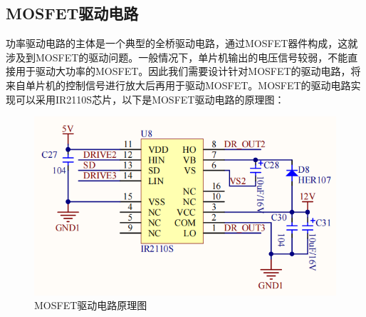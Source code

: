 \documentclass[UTF8]{article}
\begin{document}
\subsection{MOSFET驱动电路}
功率驱动电路的主体是一个典型的全桥驱动电路，通过MOSFET器件构成，这就涉及到MOSFET的驱动问题。一般情况下，单片机输出的电压信号较弱，不能直接用于驱动大功率的MOSFET。因此我们需要设计针对MOSFET的驱动电路，将来自单片机的控制信号进行放大后再用于驱动MOSFET。MOSFET的驱动电路实现可以采用IR2110S芯片，以下是MOSFET驱动电路的原理图：
\begin{figure}[H]
    \centering %
    \includegraphics[width=.8\textwidth]{figure/MOSFET驱动.png} 
    \caption{MOSFET驱动电路原理图} %
\end{figure}

\end{document}
